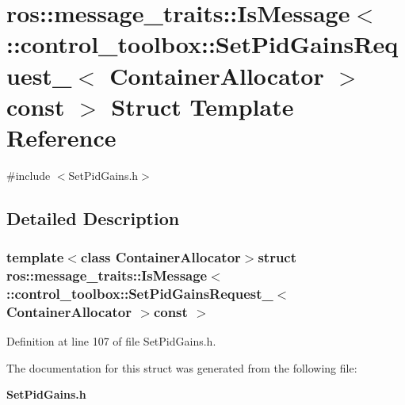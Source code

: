\section{ros\-:\-:message\-\_\-traits\-:\-:\-Is\-Message$<$ \-:\-:control\-\_\-toolbox\-:\-:\-Set\-Pid\-Gains\-Request\-\_\-$<$ \-Container\-Allocator $>$const $>$ \-Struct \-Template \-Reference}
\label{structros_1_1message__traits_1_1IsMessage_3_01_1_1control__toolbox_1_1SetPidGainsRequest___3_01C8504b0293bc11712386f4a1f38381c38}


{\ttfamily \#include $<$\-Set\-Pid\-Gains.\-h$>$}



\subsection{\-Detailed \-Description}
\subsubsection*{template$<$class Container\-Allocator$>$struct ros\-::message\-\_\-traits\-::\-Is\-Message$<$ \-::control\-\_\-toolbox\-::\-Set\-Pid\-Gains\-Request\-\_\-$<$ Container\-Allocator $>$const  $>$}



\-Definition at line 107 of file \-Set\-Pid\-Gains.\-h.



\-The documentation for this struct was generated from the following file\-:\begin{DoxyCompactItemize}
\item 
{\bf \-Set\-Pid\-Gains.\-h}\end{DoxyCompactItemize}
